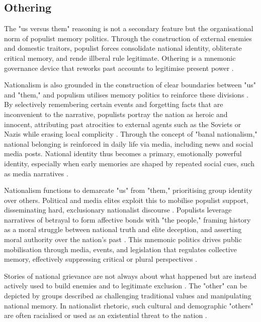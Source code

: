 \subsection{Othering}

The "us versus them" reasoning is not a secondary feature but the organisational norm of populist memory politics. Through the construction of external enemies and domestic traitors, populist forces consolidate national identity, obliterate critical memory, and rende illberal rule legitimate. Othering is a mnemonic governance device that reworks past accounts to legitimise present power \citep{subotic_political_2018}.

Nationalism is also grounded in the construction of clear boundaries between "us" and "them," and populism utilises memory politics to reinforce these divisions \citep{bieber_is_2018}. By selectively remembering certain events and forgetting facts that are inconvenient to the narrative, populists portray the nation as heroic and innocent, attributing past atrocities to external agents such as the Soviets or Nazis while erasing local complicity \citep{grabowski_memory_2018}. Through the concept of "banal nationalism," national belonging is reinforced in daily life via media, including news and social media posts. National identity thus becomes a primary, emotionally powerful identity, especially when early memories are shaped by repeated social cues, such as media narratives \citep{jamieson_theorising_2002}.

Nationalism functions to demarcate "us" from "them," prioritising group identity over others. Political and media elites exploit this to mobilise populist support, disseminating hard, exclusionary nationalist discourse \citep{bieber_is_2018}. Populists leverage narratives of betrayal to form affective bonds with "the people," framing history as a moral struggle between national truth and elite deception, and asserting moral authority over the nation's past \citep{woycicka_mnemonic_2024}. This mnemonic politics drives public mobilisation through media, events, and legislation that regulates collective memory, effectively suppressing critical or plural perspectives \citep{jamieson_theorising_2002}.

Stories of national grievance are not always about what happened but are instead actively used to build enemies and to legitimate exclusion \citep{forchtner_trajectory_2019}. The "other" can be depicted by groups described as challenging traditional values and manipulating national memory. In nationalist rhetoric, such cultural and demographic "others" are often racialised or used as an existential threat to the nation \citep{subotic_political_2018}.

